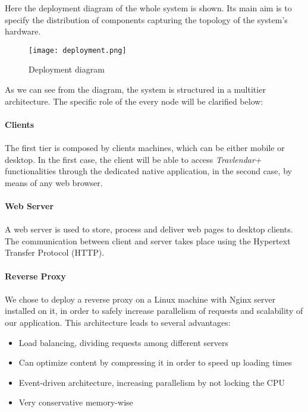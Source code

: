 Here the deployment diagram of the whole system is shown. Its main aim is to specify the distribution of components capturing the topology of the system's hardware.

\begin{figure}[H]
	\centering
	\texttt{[image: deployment.png]}
	\caption{Deployment diagram}
\end{figure}

As we can see from the diagram, the system is structured in a multitier architecture. The specific role of the every node will be clarified below:\\ \\
\noindent
\textbf{Clients} \\ \\
 The first tier is composed by clients machines, which can be either mobile or desktop. In the first case, the client will be able to access \textit{Travlendar+} functionalities through the dedicated native application, in the second case, by means of any web browser. \\ \\
\textbf{Web Server} \\ \\
A web server is used to store, process and deliver web pages to desktop clients. The communication between client and server takes place using the Hypertext Transfer Protocol (HTTP).
\\ \\
\textbf{Reverse Proxy} \\ \\
We chose to deploy a reverse proxy on a Linux machine with Nginx server installed on it, in order to safely increase parallelism of requests and scalability of our application. This architecture leads to several advantages: 
\begin{itemize}
	\item Load balancing, dividing requests among different servers
	\item Can optimize content by compressing it in order to speed up loading times
	\item Event-driven architecture, increasing parallelism by not locking the CPU
	\item Very conservative memory-wise
\end{itemize}

